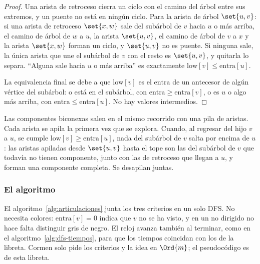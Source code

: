 \documentclass[11pt,letterpaper]{article}
\begin{document}
\begin{proof}
  Una arista de retroceso cierra un ciclo con el camino del árbol entre
  sus extremos, y un puente no está en ningún ciclo. Para la arista de
  árbol $\set{u, v}$: si una arista de retroceso $\set{x, w}$ sale del
  subárbol de $v$ hacia $u$ o más arriba, el camino de árbol de $w$ a
  $u$, la arista $\set{u, v}$, el camino de árbol de $v$ a $x$ y la
  arista $\set{x, w}$ forman un ciclo, y $\set{u, v}$ no es puente. Si
  ninguna sale, la única arista que une el subárbol de $v$ con el resto
  es $\set{u, v}$, y quitarla lo separa. ``Alguna sale hacia $u$ o más
  arriba'' es exactamente $\text{low}[v] \le \text{entra}[u]$.

  La equivalencia final se debe a que $\text{low}[v]$ es el
  $\text{entra}$ de un antecesor de algún vértice del subárbol: o está
  en el subárbol, con $\text{entra} \ge \text{entra}[v]$, o es $u$ o
  algo más arriba, con $\text{entra} \le \text{entra}[u]$. No hay
  valores intermedios.
\end{proof}

Las componentes biconexas salen en el mismo recorrido con una pila de
aristas. Cada arista se apila la primera vez que se explora. Cuando, al
regresar del hijo $v$ a $u$, se cumple
$\text{low}[v] \ge \text{entra}[u]$, nada del subárbol de $v$ salta por
encima de $u$: las aristas apiladas desde $\set{u, v}$ hasta el tope
son las del subárbol de $v$ que todavía no tienen componente, junto con
las de retroceso que llegan a $u$, y forman una componente completa. Se
desapilan juntas.

\subsubsection*{El algoritmo}

El algoritmo~\ref{alg:articulaciones} junta los tres criterios en un
solo DFS. No necesita colores: $\text{entra}[v] = 0$ indica que $v$ no
se ha visto, y en un no dirigido no hace falta distinguir gris de
negro. El reloj avanza también al terminar, como en el
algoritmo~\ref{alg:dfs-tiempos}, para que los tiempos coincidan con los
de la libreta. Cormen solo pide los criterios y la idea en $\Ord{m}$;
el pseudocódigo es de esta libreta.
\end{document}
